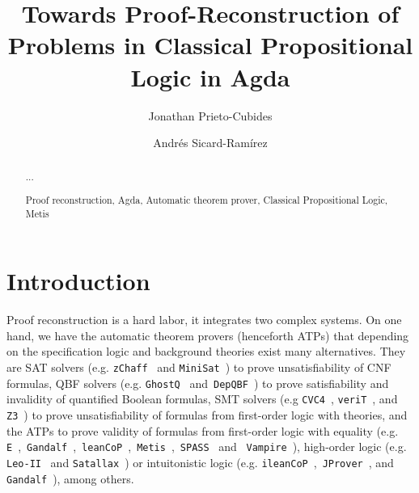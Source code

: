 \documentclass[runningheads,a4paper]{llncs}
\newcommand{\keywords}[1]{\par\addvspace\baselineskip
\noindent\keywordname\enspace\ignorespaces#1}
\begin{document}
\mainmatter  %

\title{Towards Proof-Reconstruction of Problems in Classical Propositional Logic
in Agda}


\author{Jonathan Prieto-Cubides%
\and Andr\'es Sicard-Ram\'irez}
%


\maketitle


\begin{abstract}
...
\keywords{Proof reconstruction, Agda, Automatic theorem prover, Classical Propositional Logic, Metis }
\end{abstract}

\section{Introduction}
Proof reconstruction is a hard labor, it integrates two
complex systems. On one hand, we have the automatic theorem provers (henceforth
ATPs) that depending on the specification logic and background theories exist
many alternatives. They are SAT solvers (e.g. \verb!zChaff!~\cite{Moskewicz2001} and \verb!MiniSat!~\cite{Een2004}) to prove unsatisfiability of CNF formulas,
QBF solvers (e.g. \verb!GhostQ!~\cite{Klieber2014} and~\verb!DepQBF!~\cite{Lonsing2017}) to prove satisfiability and invalidity of quantified Boolean
formulas, SMT solvers (e.g \verb!CVC4!~\cite{Barrett2011}, \verb!veriT!~\cite{bouton2009}, and \verb!Z3!~\cite{DeMoura2008}) to
prove unsatisfiability of formulas from first-order logic with theories, and the ATPs to prove validity of formulas from first-order logic with
equality (e.g. \verb!E!~\cite{Schulz:AICOM-2002},~\verb!Gandalf!~\cite{Tammet1997},~\verb!leanCoP!~\cite{Otten2008},~\verb!Metis!~\cite{hurd2003first},~\verb!SPASS!~\cite{Weidenbach2009} and ~\verb!Vampire!~\cite{Riazanov1999}),
high-order logic (e.g. \verb!Leo-II!~\cite{Benzmuller2008} and
\verb!Satallax!~\cite{Brown2012}) or  intuitonistic logic
(e.g. \verb!ileanCoP!~\cite{Otten2008},~\verb!JProver!~\cite{Schmitt2001}, and \verb!Gandalf!~\cite{Tammet1997}), among others.
\end{document}
